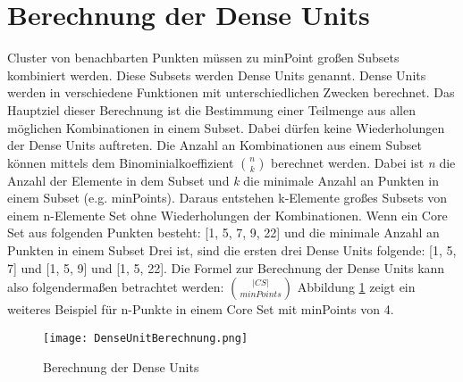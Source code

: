 \section{Berechnung der Dense Units}
\label{sec:chap3}

Cluster von benachbarten Punkten müssen zu minPoint großen Subsets kombiniert werden. Diese Subsets werden Dense Units genannt.
Dense Units werden in verschiedene Funktionen mit unterschiedlichen Zwecken berechnet. Das Hauptziel dieser Berechnung ist die Bestimmung einer Teilmenge aus allen möglichen Kombinationen in einem Subset. Dabei dürfen keine Wiederholungen der Dense Units auftreten. Die Anzahl an Kombinationen aus einem Subset können mittels dem Binominialkoeffizient $\binom{n}{k}$ berechnet werden. Dabei ist \emph{n} die Anzahl der Elemente in dem Subset und \emph{k} die minimale Anzahl an Punkten in einem Subset (e.g. minPoints). Daraus entstehen k-Elemente großes Subsets von einem n-Elemente Set ohne Wiederholungen der Kombinationen.
Wenn ein Core Set aus folgenden Punkten besteht: [1, 5, 7, 9, 22] und die minimale Anzahl an Punkten in einem Subset Drei ist, sind die ersten drei Dense Units folgende: [1, 5, 7] und [1, 5, 9] und [1, 5, 22]. Die Formel zur Berechnung der Dense Units kann also folgendermaßen betrachtet werden: 
$ \binom{|CS|}{minPoints}$ \cite{7022654} Abbildung \ref{dense-calculation} zeigt ein weiteres Beispiel für n-Punkte in einem Core Set mit minPoints von 4.

\begin{figure}
	\centering
	\texttt{[image: DenseUnitBerechnung.png]}
	\caption{Berechnung der Dense Units}
	\label{dense-calculation}
\end{figure}